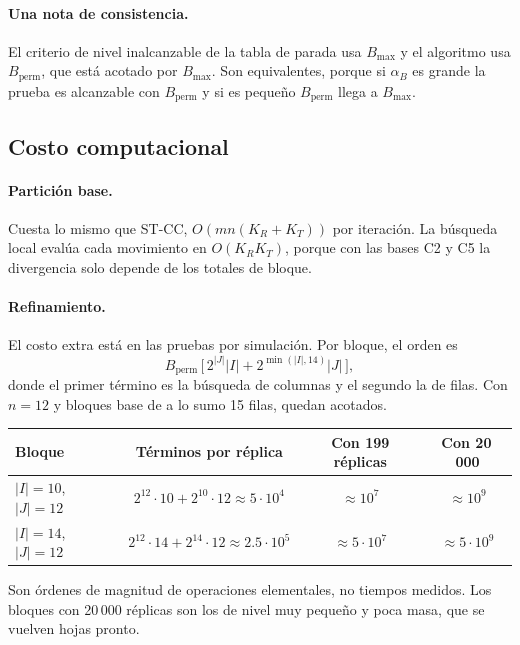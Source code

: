 \documentclass[11pt,a4paper]{article}
\begin{document}
\paragraph{Una nota de consistencia.} El criterio de nivel inalcanzable de la tabla de
parada usa $B_{\max}$ y el algoritmo usa $B_{\mathrm{perm}}$, que está acotado por
$B_{\max}$. Son equivalentes, porque si $\alpha_B$ es grande la prueba es alcanzable
con $B_{\mathrm{perm}}$ y si es pequeño $B_{\mathrm{perm}}$ llega a $B_{\max}$.

\subsection{Costo computacional}

\paragraph{Partición base.} Cuesta lo mismo que ST-CC, $O(mn(K_R+K_T))$ por iteración.
La búsqueda local evalúa cada movimiento en $O(K_RK_T)$, porque con las bases C2 y C5
la divergencia solo depende de los totales de bloque.

\paragraph{Refinamiento.} El costo extra está en las pruebas por simulación. Por
bloque, el orden es
\[
B_{\mathrm{perm}}\,\bigl[\,2^{|J|}|I|+2^{\min(|I|,14)}|J|\,\bigr],
\]
donde el primer término es la búsqueda de columnas y el segundo la de filas. Con
$n=12$ y bloques base de a lo sumo 15 filas, quedan acotados.

\begin{center}
\small
\begin{tabular}{@{}lccc@{}}
\toprule
Bloque & Términos por réplica & Con 199 réplicas & Con 20\,000 \\
\midrule
$|I|=10$, $|J|=12$ & $2^{12}\cdot10+2^{10}\cdot12\approx5\cdot10^4$ & $\approx10^7$ & $\approx10^9$ \\
$|I|=14$, $|J|=12$ & $2^{12}\cdot14+2^{14}\cdot12\approx2.5\cdot10^5$ & $\approx5\cdot10^7$ & $\approx5\cdot10^9$ \\
\bottomrule
\end{tabular}
\end{center}

Son órdenes de magnitud de operaciones elementales, no tiempos medidos. Los bloques con
20\,000 réplicas son los de nivel muy pequeño y poca masa, que se vuelven hojas pronto.
\end{document}

